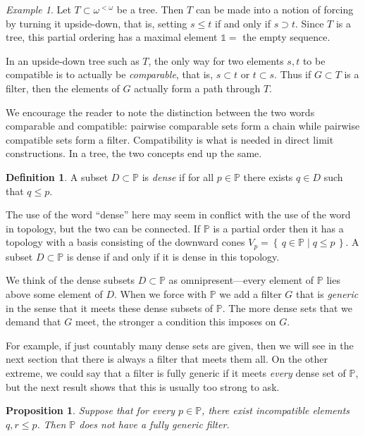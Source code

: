 \documentclass[11pt,oneside]{amsbook}
\newcommand{\set}[1]{\left\{\,#1\,\right\}}
\newcommand{\PP}{\mathbb P}
\theoremstyle{definition}
\theoremstyle{plain}
\newtheorem{proposition}[theorem]{Proposition}
\theoremstyle{definition}
\newtheorem{definition}[theorem]{Definition}
\theoremstyle{remark}
\newtheorem{example}[theorem]{Example}
\numberwithin{equation}{section}
\numberwithin{figure}{section}
\begin{document}
\begin{example}
  Let $T\subset\omega^{<\omega}$ be a tree. Then $T$ can be made into a notion of forcing by turning it upside-down, that is, setting $s\leq t$ if and only if $s\supset t$. Since $T$ is a tree, this partial ordering has a maximal element $\mathbb1=$ the empty sequence.

  In an upside-down tree such as $T$, the only way for two elements $s,t$ to be compatible is to actually be \emph{comparable}, that is, $s\subset t$ or $t\subset s$. Thus if $G\subset T$ is a filter, then the elements of $G$ actually form a path through $T$.
\end{example}

We encourage the reader to note the distinction between the two words comparable and compatible: pairwise comparable sets form a chain while pairwise compatible sets form a filter. Compatibility is what is needed in direct limit constructions. In a tree, the two concepts end up the same.

\begin{definition}
  A subset $D\subset\PP$ is \emph{dense} if for all $p\in\PP$ there exists $q\in D$ such that $q\leq p$.
\end{definition}

The use of the word ``dense'' here may seem in conflict  with the use of the word in topology, but the two can be connected. If $\PP$ is a partial order then it has a topology with a basis consisting of the downward cones $V_p=\set{q\in\PP\mid q\leq p}$. A subset $D\subset\PP$ is dense if and only if it is dense in this topology.

We think of the dense subsets $D\subset\PP$ as omnipresent---every element of $\PP$ lies above some element of $D$. When we force with $\PP$ we add a filter $G$ that is \emph{generic} in the sense that it meets these dense subsets of $\PP$. The more dense sets that we demand that $G$ meet, the stronger a condition this imposes on $G$.

For example, if just countably many dense sets are given, then we will see in the next section that there is always a filter that meets them all. On the other extreme, we could say that a filter is fully generic if it meets \emph{every} dense set of $\PP$, but the next result shows that this is usually too strong to ask.

\begin{proposition}
  \label{prop:generic-new}
  Suppose that for every $p\in\PP$, there exist incompatible elements $q,r\leq p$. Then $\PP$ does not have a fully generic filter.
\end{proposition}
\end{document}
